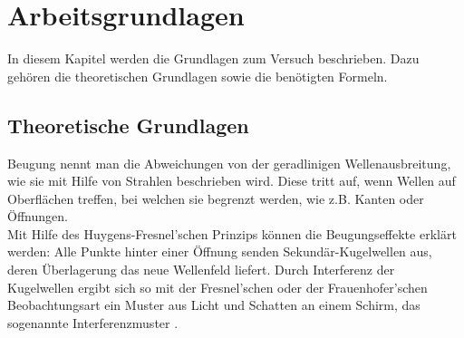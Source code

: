 \chapter{Arbeitsgrundlagen}
\setcounter{page}{1} \thispagestyle{fancy} 
In diesem Kapitel werden die Grundlagen zum Versuch beschrieben. Dazu gehören die theoretischen Grundlagen sowie die benötigten Formeln.

\section{Theoretische Grundlagen}
Beugung nennt man die Abweichungen von der geradlinigen Wellenausbreitung, wie sie mit Hilfe von Strahlen beschrieben wird. Diese tritt auf, wenn Wellen auf Oberflächen treffen, bei welchen sie begrenzt werden, wie z.B. Kanten oder Öffnungen\cite{Angaben2011}.\\[0.5cm]Mit Hilfe des Huygens-Fresnel’schen Prinzips können die Beugungseffekte erklärt werden: Alle Punkte hinter einer Öffnung senden Sekundär-Kugelwellen aus, deren Überlagerung das neue Wellenfeld liefert. Durch Interferenz der Kugelwellen ergibt sich so mit der Fresnel'schen oder der Frauenhofer'schen Beobachtungsart ein Muster aus Licht und Schatten an einem Schirm, das sogenannte Interferenzmuster \cite{Angaben2011}.\\

